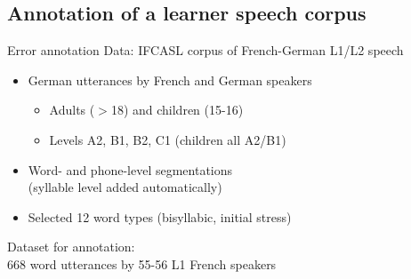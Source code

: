 \documentclass[xcolor={dvipsnames}]{beamer}
\begin{document}
	\subsection{Annotation of a learner speech corpus}
		\begin{frame}{Error annotation}
		Data: IFCASL corpus of French-German L1/L2 speech
		\begin{itemize}
			\item{German utterances by French and German speakers
				\begin{itemize}
				\item Adults ($>$18) and children (15-16)
				\item Levels A2, B1, B2, C1 (children all A2/B1)
				\end{itemize}
			}
			\item{Word- and phone-level segmentations\\(syllable level added automatically)}
			\item{Selected 12 word types (bisyllabic, initial stress)}

		\end{itemize}
		
		\vfill
		Dataset for annotation:\\
		\hspace*{20pt} 668 word utterances by 55-56 L1 French speakers
		\end{frame}
		
\end{document}
